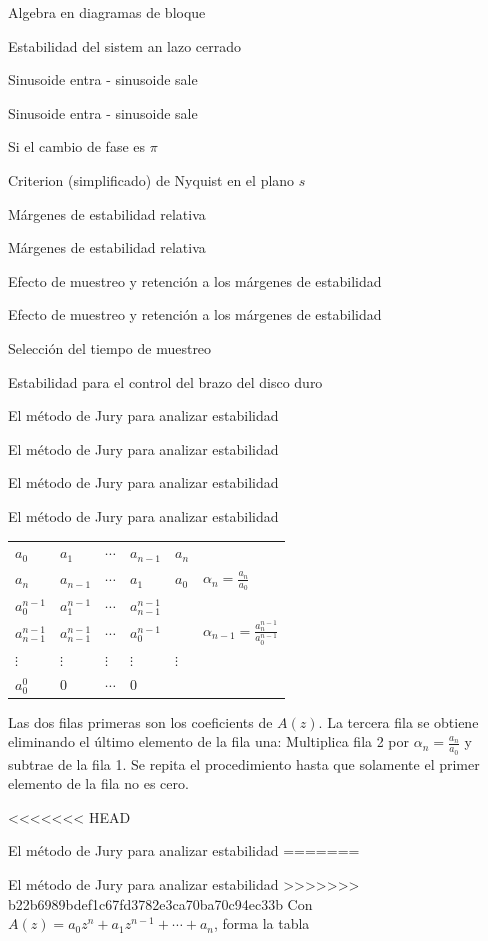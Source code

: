 \documentclass[presentation,aspectratio=169]{beamer}
\begin{document}
\begin{frame}[label={sec:org8e8e439}]{Algebra en diagramas de bloque}
\begin{frame}[label={sec:org5218f19}]{Estabilidad del sistem an lazo cerrado}
\begin{frame}[label={sec:org4ce2307}]{Sinusoide entra - sinusoide sale}
\begin{frame}[label={sec:orgc598966}]{Sinusoide entra - sinusoide sale}
\begin{frame}[label={sec:orgbd54147}]{Si el cambio de fase es \(\pi\)}
\begin{frame}[label={sec:orgf06388b}]{Criterion (simplificado) de Nyquist en el plano \(s\)}
\begin{frame}[label={sec:org5967884}]{Márgenes de estabilidad relativa}
\begin{frame}[label={sec:orgb5ba0e3}]{Márgenes de estabilidad relativa}
\begin{frame}[label={sec:orga8344a9}]{Efecto de muestreo y retención a los márgenes de estabilidad}
\begin{frame}[label={sec:org5e3653d}]{Efecto de muestreo y retención a los márgenes de estabilidad}
\begin{frame}[label={sec:orgd9a9d5d}]{Selección del tiempo de muestreo}
\begin{frame}[label={sec:org2cdebfb}]{Estabilidad para el control del brazo del disco duro}
\begin{frame}[label={sec:org6242817}]{El método de Jury para analizar estabilidad}
\begin{frame}[label={sec:org7c040d1}]{El método de Jury para analizar estabilidad}
\begin{frame}[label={sec:org85b11cd}]{El método de Jury para analizar estabilidad}
\begin{frame}[label={sec:org7fceb23}]{El método de Jury para analizar estabilidad}
\begin{center}
\begin{tabular}{llllll}
\(a_0\) & \(a_1\) & \(\cdots\) & \(a_{n-1}\) & \(a_n\) & \\
\(a_n\) & \(a_{n-1}\) & \(\cdots\) & \(a_1\) & \(a_0\) & \(\alpha_n =\frac{a_n}{a_0}\)\\
\hline
\(a_0^{n-1}\) & \(a_1^{n-1}\) & \(\cdots\) & \(a_{n-1}^{n-1}\) &  & \\
\(a_{n-1}^{n-1}\) & \(a_{n-1}^{n-1}\) & \(\cdots\) & \(a_0^{n-1}\) &  & \(\alpha_{n-1} =\frac{a_n^{n-1}}{a_0^{n-1}}\)\\
\hline
\(\vdots\) & \(\vdots\) & \(\vdots\) & \(\vdots\) & \(\vdots\) & \\
\hline
\(a_0^{0}\) & 0 & \(\cdots\) & 0 &  & \\
\end{tabular}
\end{center}

Las dos filas primeras son los coeficients de \(A(z)\). La tercera fila se obtiene eliminando el último elemento de la fila una: Multiplica fila 2 por \(\alpha_n = \frac{a_n}{a_0}\) y subtrae de la fila 1. Se repita el procedimiento hasta que solamente el primer elemento de la fila no es cero.
\end{frame}

<<<<<<< HEAD
\begin{frame}[label={sec:org8bd183d}]{El método de Jury para analizar estabilidad}
=======
\begin{frame}[label={sec:orgc830ada}]{El método de Jury para analizar estabilidad}
>>>>>>> b22b6989bdef1c67fd3782e3ca70ba70c94ec33b
Con \(A(z) = a_0z^n + a_1z^{n-1} + \cdots + a_n\), forma la tabla


\end{frame}
\end{frame}
\end{frame}
\end{frame}
\end{frame}
\end{frame}
\end{frame}
\end{frame}
\end{frame}
\end{frame}
\end{frame}
\end{frame}
\end{frame}
\end{frame}
\end{frame}
\end{frame}
\end{frame}
\end{document}
